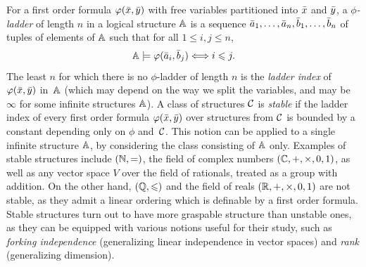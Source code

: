 \medskip
For   a first order formula 
$\varphi(\bar{x},\bar{y})$ 
 with free variables
partitioned into  $\bar{x}$ and $\bar{y}$,
a \emph{$\phi$-ladder}
of length $n$ in a logical structure $\mathbb A$ is a sequence $\bar{a}_1,\ldots, \bar{a}_{n},
\bar{b}_1,\ldots, \bar{b}_{n}$ of tuples of elements of $\mathbb A$ 
such that for all $1\leq i,j\le n$,
\[\mathbb{A}\models\varphi(\bar{a}_i,\bar{b}_j)\Longleftrightarrow i\leqslant j. \]
The least  $n$ for which 
there is no $\phi$-ladder of length $n$ is 
the \emph{ladder index} 
of $\varphi(\bar{x},\bar{y})$ in~$\mathbb A$ (which may depend on the way we split the
variables, and may be $\infty$ for some infinite structures $\mathbb A$). A class of structures $\mathcal{C}$ is \emph{stable} if
the ladder index of every first order formula $\varphi(\bar{x},\bar{y})$ over
structures from $\mathcal{C}$ is bounded by a constant depending only on $\phi$ 
and~$\mathcal{C}$. This notion can be applied to a single infinite structure $\mathbb A$, by considering the class consisting of $\mathbb A$ only.
Examples of stable structures include $(\mathbb N,=)$,
the field of complex numbers $(\mathbb C,+,\times,0,1)$,
as well as any vector space $V$ over the field of rationals, treated as a group with addition. On the other hand, $(\mathbb Q,\leqslant)$ and the field of reals $(\mathbb R,+,\times,0,1)$ are not stable, as they admit a linear ordering which is definable by a first order formula.
Stable structures turn out to have more graspable  structure than unstable ones, as they can be equipped with various notions 
useful for their study, such as
\emph{ forking independence} (generalizing linear independence in vector spaces)
and \emph{rank} (generalizing dimension).




  
  



